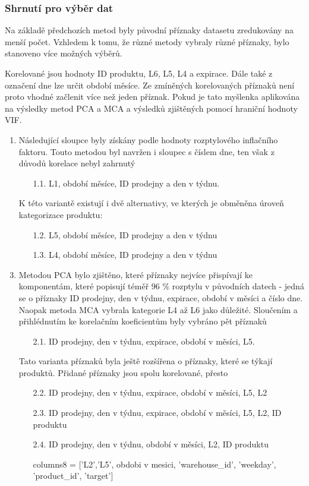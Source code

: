 \subsubsection*{Shrnutí pro výběr dat}

Na základě předchozích metod byly původní příznaky datasetu zredukovány na menší počet. Vzhledem k tomu, že různé metody vybraly různé příznaky, bylo stanoveno více možných výběrů.

Korelované jsou hodnoty ID produktu, L6, L5, L4 a expirace. Dále také z označení dne lze určit období měsíce. Ze zmíněných korelovaných příznaků není proto vhodné začlenit více než jeden příznak. Pokud je tato myšlenka aplikována na výsledky metod PCA a MCA a výsledků zjištěných pomocí hraniční hodnoty VIF.

\begin{enumerate}
    \item Následující sloupce byly získány podle hodnoty rozptylového inflačního faktoru. Touto metodou byl navržen i sloupec s číslem dne, ten však z důvodů korelace nebyl zahrnutý
    \begin{enumerate}
        \item[1.1.] L1, období měsíce, ID prodejny a den v týdnu.
    \end{enumerate}
    
    \item[] K této variantě existují i dvě alternativy, ve kterých je obměněna úroveň kategorizace produktu:     
    \begin{enumerate}
    \item[1.2.] L5, období měsíce, ID prodejny a den v týdnu
    \item[1.3.] L4, období měsíce, ID prodejny a den v týdnu
    \end{enumerate}
    \item Metodou PCA bylo zjištěno, které příznaky nejvíce přispívají ke komponentám, které popisují téměř 96 \% rozptylu v původních datech - jedná se o příznaky ID prodejny, den v týdnu, expirace, období v měsíci a číslo dne. Naopak metoda MCA vybrala kategorie L4 až L6 jako důležité. Sloučením a přihlédnutím ke korelačním koeficientům byly vybráno pět příznaků
    \begin{enumerate}
        \item[2.1.] ID prodejny, den v týdnu, expirace, období v měsíci, L5.
    \end{enumerate}
    \item[] Tato varianta příznaků byla ještě rozšířena o příznaky, které se týkají produktů. Přidané příznaky jsou spolu korelované, přesto 
    \begin{enumerate}
    \item[2.2.] ID prodejny, den v týdnu, expirace, období v měsíci, L5, L2
    \item[2.3.] ID prodejny, den v týdnu, expirace, období v měsíci, L5, L2, ID produktu
    \item[2.4.] ID prodejny, den v týdnu, období v měsíci, L2, ID produktu
    \item[] columns8 = ['L2','L5', obdobi v mesici, 'warehouse_id', 'weekday', 'product_id', 'target']
    \end{enumerate}
\end{enumerate}

